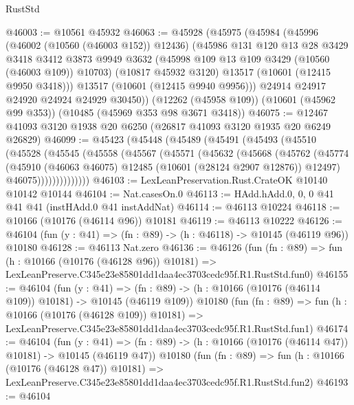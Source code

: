 \begin{lexlean}{RustStd}
\begin{coremodule}
@46003 := @10561 @45932
@46063 := @45928
    (@45975
      (@45984
        (@45996
          (@46002 (@10560 (@46003 @152)) @12436)
          (@45986
            @131
            @120
            @13
            @28
            @3429
            @3418
            @3412
            @3873
            @9949
            @3632
            (@45998 @109 @13 @109 @3429 (@10560 (@46003 @109)) @10703)
            (@10817 @45932 @3120)
            @13517
            (@10601 (@12415 @9950 @3418)))
          @13517
          (@10601 (@12415 @9940 @9956)))
        @24914
        @24917
        @24920
        @24924
        @24929
        @30450))
    (@12262 (@45958 @109))
    (@10601 (@45962 @99 @353))
    (@10485 (@45969 @353 @98 @3671 @3418))
@46075 := @12467 @41093 @3120 @1938 @20 @6250 (@26817 @41093 @3120 @1935 @20 @6249 @26829)
@46099 := @45423
    (@45448
      (@45489
        (@45491
          (@45493
            (@45510
              (@45528
                (@45545
                  (@45558
                    (@45567
                      (@45571
                        (@45632
                          (@45668
                            (@45762
                              (@45774
                                (@45910
                                  (@46063 @46075)
                                  @12485
                                  (@10601 (@28124 @2907 @12876))
                                  @12497)
                                @46075))))))))))))))
@46103 := LexLeanPreservation.Rust.CrateOK @10140 @10142 @10144
@46104 := Nat.casesOn.{0}
@46113 := HAdd.hAdd.{0, 0, 0} @41 @41 @41 (instHAdd.{0} @41 instAddNat)
@46114 := @46113 @10224
@46118 := @10166 (@10176 (@46114 @96)) @10181
@46119 := @46113 @10222
@46126 := @46104 (fun (y : @41) => (fn : @89) -> (h : @46118) -> @10145 (@46119 @96)) @10180
@46128 := @46113 Nat.zero
@46136 := @46126
    (fun (fn : @89) =>
    fun (h : @10166 (@10176 (@46128 @96)) @10181) =>
    LexLeanPreserve.C345e23e85801dd1daa4ec3703cedc95f.R1.RustStd.fun0)
@46155 := @46104
    (fun (y : @41) =>
    (fn : @89) -> (h : @10166 (@10176 (@46114 @109)) @10181) -> @10145 (@46119 @109))
    @10180
    (fun (fn : @89) =>
    fun (h : @10166 (@10176 (@46128 @109)) @10181) =>
    LexLeanPreserve.C345e23e85801dd1daa4ec3703cedc95f.R1.RustStd.fun1)
@46174 := @46104
    (fun (y : @41) =>
    (fn : @89) -> (h : @10166 (@10176 (@46114 @47)) @10181) -> @10145 (@46119 @47))
    @10180
    (fun (fn : @89) =>
    fun (h : @10166 (@10176 (@46128 @47)) @10181) =>
    LexLeanPreserve.C345e23e85801dd1daa4ec3703cedc95f.R1.RustStd.fun2)
@46193 := @46104

\end{coremodule}
\end{lexlean}
